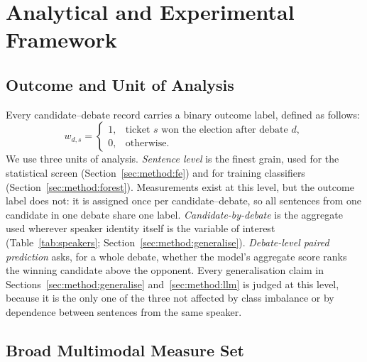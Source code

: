 \documentclass[journal]{IEEEtran}
\begin{document}
\section{Analytical and Experimental Framework}
\label{sec:method}

\subsection{Outcome and Unit of Analysis}
\label{sec:method:unit}

Every candidate--debate record carries a binary outcome label, defined as
follows:
\begin{equation}
w_{d,s} =
\begin{cases}
1, & \text{ticket } s\text{ won the election after debate } d, \\
0, & \text{otherwise.}
\end{cases}
\label{eq:outcome}
\end{equation}
We use three units of analysis. \emph{Sentence level} is the finest grain,
used for the statistical screen (Section~\ref{sec:method:fe}) and for
training classifiers (Section~\ref{sec:method:forest}). Measurements exist at
this level, but the outcome label does not: it is assigned once per
candidate--debate, so all sentences from one candidate in one debate share
one label. \emph{Candidate-by-debate} is the aggregate used wherever speaker
identity itself is the variable of interest (Table~\ref{tab:speakers};
Section~\ref{sec:method:generalise}). \emph{Debate-level paired prediction}
asks, for a whole debate, whether the model's aggregate score ranks the
winning candidate above the opponent. Every generalisation claim in
Sections~\ref{sec:method:generalise} and~\ref{sec:method:llm} is judged at
this level, because it is the only one of the three not affected by class
imbalance or by dependence between sentences from the same speaker.

\subsection{Broad Multimodal Measure Set}
\label{sec:method:measures}
\end{document}
